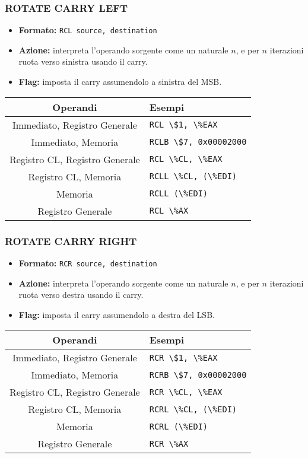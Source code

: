 \documentclass[a4paper,11pt]{article}
\begin{document}
\subsubsection{ROTATE CARRY LEFT}
\begin{itemize}
	\item \textbf{Formato:} \lstinline|RCL source, destination|
	\item \textbf{Azione:} interpreta l'operando sorgente come un naturale $n$, e per $n$ iterazioni ruota verso sinistra usando il carry.
	\item \textbf{Flag:} imposta il carry assumendolo a sinistra del MSB.
\end{itemize}

		\begin{table}[H]
		\center {}
			\begin{tabular} { c | p{5cm} }
				\bfseries Operandi & \bfseries Esempi \\
				\hline
				Immediato, Registro Generale & \lstinline|RCL \$1, \%EAX| \\
				Immediato, Memoria & \lstinline|RCLB \$7, 0x00002000| \\
				Registro CL, Registro Generale & \lstinline|RCL \%CL, \%EAX| \\
				Registro CL, Memoria & \lstinline|RCLL \%CL, (\%EDI)| \\
				Memoria & \lstinline|RCLL (\%EDI)| \\ 
				Registro Generale & \lstinline|RCL \%AX|
			\end{tabular}
		\end{table}

\subsubsection{ROTATE CARRY RIGHT}
\begin{itemize}
	\item \textbf{Formato:} \lstinline|RCR source, destination|
	\item \textbf{Azione:} interpreta l'operando sorgente come un naturale $n$, e per $n$ iterazioni ruota verso destra usando il carry.
	\item \textbf{Flag:} imposta il carry assumendolo a destra del LSB.
\end{itemize}

		\begin{table}[H]
		\center {}
			\begin{tabular} { c | p{5cm} }
				\bfseries Operandi & \bfseries Esempi \\
				\hline
				Immediato, Registro Generale & \lstinline|RCR \$1, \%EAX| \\
				Immediato, Memoria & \lstinline|RCRB \$7, 0x00002000| \\
				Registro CL, Registro Generale & \lstinline|RCR \%CL, \%EAX| \\
				Registro CL, Memoria & \lstinline|RCRL \%CL, (\%EDI)| \\
				Memoria & \lstinline|RCRL (\%EDI)| \\ 
				Registro Generale & \lstinline|RCR \%AX|
			\end{tabular}
		\end{table}
\end{document}
